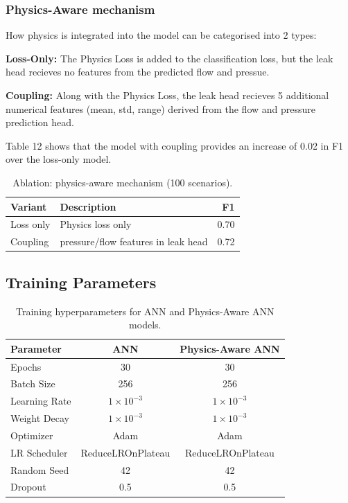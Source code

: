 \documentclass[final,5p,times,twocolumn,authoryear]{elsarticle}
\begin{document}
\subsubsection*{\textbf{Physics-Aware mechanism}}

How physics is integrated into the model can be categorised into 2 types:

\textbf{Loss-Only:} The Physics Loss is added to the classification loss, but the leak head recieves no features from the predicted flow and pressue.

\textbf{Coupling:} Along with the Physics Loss, the leak head recieves 5 additional numerical features (mean, std, range) derived from the flow and pressure prediction head.

Table 12 shows that the model with coupling provides an increase of 0.02 in F1 over the loss-only model.

\begin{table}[H]
\centering
\caption{Ablation: physics-aware mechanism (100 scenarios).}
\label{tab:abl_physics}
\small
\begin{tabular}{@{}llr@{}}
\toprule
\textbf{Variant} & \textbf{Description} & \textbf{F1} \\ \midrule
Loss only & Physics loss only & 0.70 \\
Coupling & pressure/flow features in leak head & 0.72 \\ 
\bottomrule
\end{tabular}
\end{table}

\subsection{Training Parameters}

\begin{table}[H]
\centering
\caption{Training hyperparameters for ANN and Physics-Aware ANN models.}
\label{tab:training_params}
\small
\begin{tabular}{@{}lcc@{}}
\toprule
\textbf{Parameter} & \textbf{ANN} & \textbf{Physics-Aware ANN} \\ \midrule
Epochs & 30 & 30 \\
Batch Size & 256 & 256 \\
Learning Rate & $1 \times 10^{-3}$ & $1 \times 10^{-3}$ \\
Weight Decay & $1 \times 10^{-3}$ & $1 \times 10^{-3}$ \\
Optimizer & Adam & Adam \\
LR Scheduler & ReduceLROnPlateau & ReduceLROnPlateau \\
Random Seed & 42 & 42 \\
Dropout & 0.5 & 0.5 \\
\bottomrule
\end{tabular}
\end{table}
\end{document}
